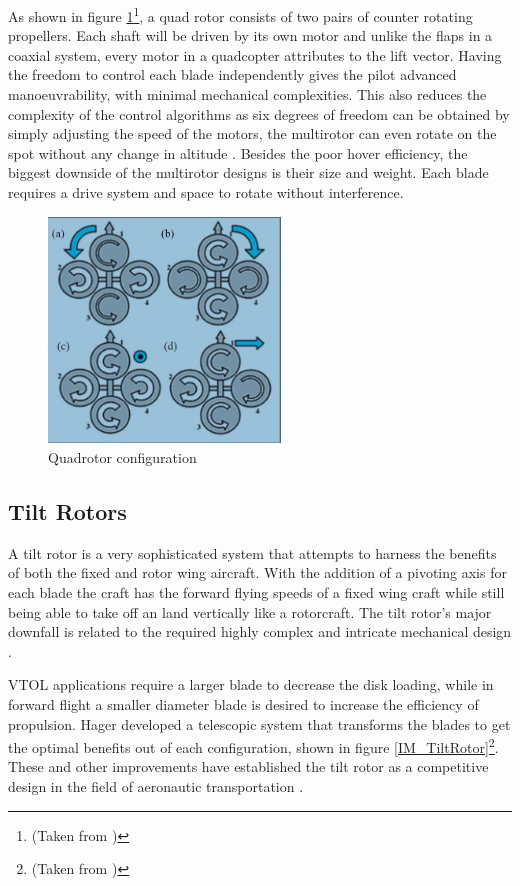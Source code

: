 As shown in figure \ref{IM_CounterBlades}\footnote{(Taken from \cite{ThrustCritical})}, a quad rotor consists of two pairs of counter rotating propellers. Each shaft will be driven by its own motor and unlike the flaps in a coaxial system, every motor in a quadcopter attributes to the lift vector. Having the freedom to control each blade independently gives the pilot advanced manoeuvrability, with minimal mechanical complexities. This also reduces the complexity of the control algorithms as six degrees of freedom can be obtained by simply adjusting the speed of the motors, the multirotor can even rotate on the spot without any change in altitude \cite{ThrustCritical}. Besides the poor hover efficiency, the biggest downside of the multirotor designs is their size and weight. Each blade requires a drive system and space to rotate without interference.

\begin{figure}[H]
\centering
\includegraphics[height =6cm]{Images/Literature/QuadBlades}
\caption{Quadrotor configuration \cite{ThrustCritical}}
\label{IM_CounterBlades}
\end{figure}



\subsection{Tilt Rotors}

A tilt rotor is a very sophisticated system that attempts to harness the benefits of both the fixed and rotor wing aircraft. With the addition of a pivoting axis for each blade the craft has the forward flying speeds of a fixed wing craft while still being able to take off an land vertically like a rotorcraft. The tilt rotor's major downfall is related to the required highly complex and intricate mechanical design \cite{RotorConfig}.
 
VTOL applications require a larger blade to decrease the disk loading, while in forward flight a smaller diameter blade is desired to increase the efficiency of propulsion. Hager \cite{US6030177} developed a telescopic system that transforms the blades to get the optimal benefits out of each configuration, shown in figure \ref{IM_TiltRotor}\footnote{(Taken from \cite{Heli})}. These and other improvements have established the tilt rotor as a  competitive design in the field of aeronautic transportation \cite{RotorConfig}.

